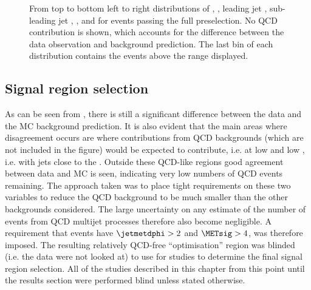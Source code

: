 \begin{figure}
  \caption{From top to bottom left to right distributions of \detajj, \Mjj, leading jet \pt, sub-leading jet \pt, \METnoMU, \METsig and \jetmetdphi for events passing the full preselection. No \ac{QCD} contribution is shown, which accounts for the difference between the data observation and background prediction. The last bin of each distribution contains the events above the range displayed.}
  \label{fig:parkedpostpresel}
\end{figure}




\subsection{Signal region selection}
\label{sec:parkedsigsel}
As can be seen from , there is still a significant difference between the data and the \ac{MC} background prediction. It is also evident that the main areas where disagreement occurs are where contributions from \ac{QCD} backgrounds (which are not included in the figure) would be expected to contribute, i.e. at low \METsig and low \jetmetdphi, i.e. with jets close to the \METnoMU. Outside these \ac{QCD}-like regions good agreement between data and \ac{MC} is seen, indicating very low numbers of \ac{QCD} events remaining. The approach taken was to place tight requirements on these two variables to reduce the \ac{QCD} background to be much smaller than the other backgrounds considered. The large uncertainty on any estimate of the number of events from \ac{QCD} multijet processes therefore also become negligible. A requirement that events have $\jetmetdphi>2$ and $\METsig>4$, was therefore imposed. The resulting relatively \ac{QCD}-free ``optimisation'' region was blinded (i.e. the data were not looked at) to use for studies to determine the final signal region selection. All of the studies described in this chapter from this point until the results section were performed blind unless stated otherwise.

